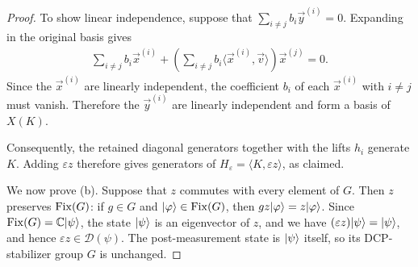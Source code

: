 \begin{proof}
    To show linear independence, suppose that $\sum_{i\neq j}b_i\vec{y}^{(i)}=0$.
    Expanding in the original basis gives
    \begin{align}
        \sum_{i\neq j}b_i\vec{x}^{(i)}
        +\left(\sum_{i\neq j}b_i\langle\vec{x}^{(i)},\vec v\rangle\right)\vec{x}^{(j)}
        =0.
    \end{align}
    Since the $\vec{x}^{(i)}$ are linearly independent, the coefficient $b_i$ of each $\vec{x}^{(i)}$ with $i\neq j$ must vanish.
    Therefore the $\vec{y}^{(i)}$ are linearly independent and form a basis of $X(K)$.

    Consequently, the retained diagonal generators together with the lifts $h_i$ generate $K$.
    Adding $\varepsilon z$ therefore gives generators of $H_\varepsilon=\langle K,\varepsilon z\rangle$, as claimed.

    We now prove (b). Suppose that $z$ commutes with every element of $G$.
    Then $z$ preserves $\operatorname{Fix}(G)$: if $g\in G$ and $|\varphi\rangle\in\operatorname{Fix}(G)$, then
    $gz|\varphi\rangle=z|\varphi\rangle$.  Since
    $\operatorname{Fix}(G)=\mathbb{C}|\psi\rangle$, the state $|\psi\rangle$ is an eigenvector of $z$, and we have $(\varepsilon z)|\psi\rangle=|\psi\rangle$, and hence $\varepsilon z\in\mathcal{D}(\psi)$.  The post-measurement state is
    $|\psi\rangle$ itself, so its DCP-stabilizer group $G$ is unchanged.
\end{proof}
